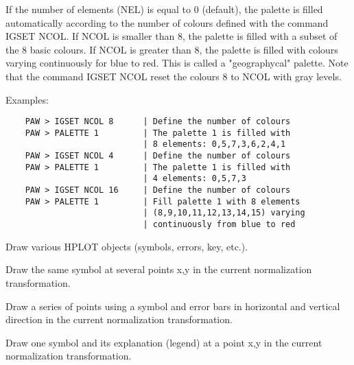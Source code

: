 If the number of elements (NEL) is equal to 0 (default), the
palette is filled automatically according to the number of
colours defined with the command IGSET NCOL. If NCOL is smaller
than 8, the palette is filled with a subset of the 8 basic
colours. If NCOL is greater than 8, the palette is filled
with colours varying continuously for blue to red. This is
called a "geographycal" palette. Note that the command
IGSET NCOL reset the colours 8 to NCOL with gray levels.

Examples:

\begin{verbatim}
    PAW > IGSET NCOL 8      | Define the number of colours
    PAW > PALETTE 1         | The palette 1 is filled with
                            | 8 elements: 0,5,7,3,6,2,4,1
    PAW > IGSET NCOL 4      | Define the number of colours
    PAW > PALETTE 1         | The palette 1 is filled with
                            | 4 elements: 0,5,7,3
    PAW > IGSET NCOL 16     | Define the number of colours
    PAW > PALETTE 1         | Fill palette 1 with 8 elements
                            | (8,9,10,11,12,13,14,15) varying
                            | continuously from blue to red
\end{verbatim}
\ENDTEXT


\BEGTEXT
Draw various HPLOT objects (symbols, errors, key, etc.).
\ENDTEXT

\BEGARG
{}
\ENDARG
\BEGTEXT
Draw the same symbol at several points x,y
in the current normalization transformation.
\ENDTEXT

\BEGARG
{}
\ENDARG
\BEGTEXT
Draw a series of points using a symbol and error bars
in horizontal and vertical direction in the current
normalization transformation.
\ENDTEXT

\BEGARG
{}
\ENDARG
\BEGTEXT
Draw one symbol and its explanation (legend) at a point x,y
in the current normalization transformation.
\ENDTEXT

